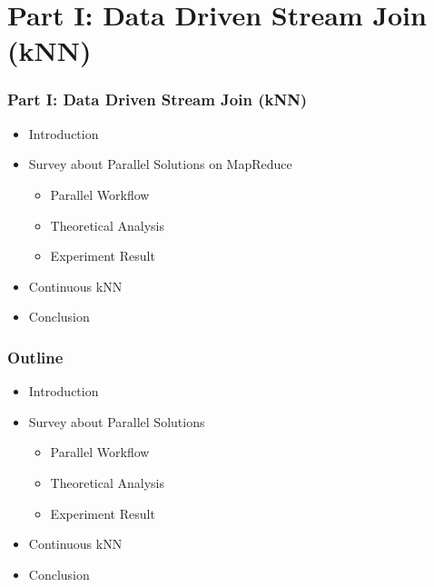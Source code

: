 \section{Part I: Data Driven Stream Join (kNN)}

\begin{comment}
\begin{frame}[t]
\frametitle{Part I: Data Driven Stream Join (kNN)}
    \begin{center}
    	\includegraphics<1>[width=1\textwidth]{figs/knn.png}
    \end{center}
\end{frame}
\end{comment}



\begin{frame}
\frametitle{Part I: Data Driven Stream Join (kNN)}
	\begin{itemize}
		\item Introduction
		\item Survey about Parallel Solutions on MapReduce
		\begin{itemize}
		\item Parallel Workflow
		\item Theoretical Analysis
		\item Experiment Result
		\end{itemize}
		\item Continuous kNN
		\item Conclusion
	\end{itemize}
\end{frame}


\begin{frame}
\frametitle{Outline}
	\begin{itemize}
		\item Introduction
		\item \textcolor{blue!20}{Survey about Parallel Solutions}
		\begin{itemize}
		\item \textcolor{blue!20}{Parallel Workflow}
		\item \textcolor{blue!20}{Theoretical Analysis}
		\item \textcolor{blue!20}{Experiment Result}
		\end{itemize}
		\item \textcolor{blue!20}{Continuous kNN}
		\item \textcolor{blue!20}{Conclusion}
	\end{itemize}
\end{frame}


